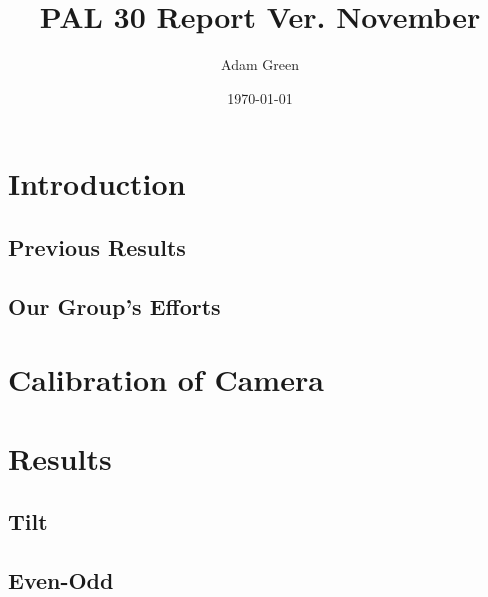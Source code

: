 \documentclass[reprint]{revtex4-1}
\begin{document}
\title{PAL 30 Report Ver. November}
\date{\today}
\author{Adam Green}

\maketitle

\section*{\label{sec:intro} Introduction}

\subsection*{Previous Results}
\subsection*{Our Group's Efforts}

\section*{Calibration of Camera}

\section*{Results}
\subsection*{Tilt}
\subsection*{Even-Odd}
\end{document}
